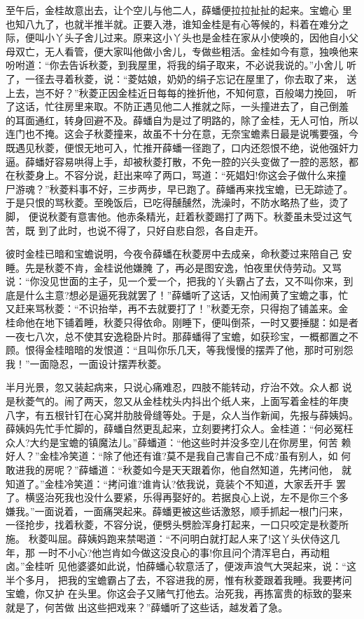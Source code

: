 至午后，金桂故意出去，让个空儿与他二人，薛蟠便拉拉扯扯的起来。宝蟾心
里也知八九了，也就半推半就。正要入港，谁知金桂是有心等候的，料着在难分之
际，便叫小丫头子舍儿过来。原来这小丫头也是金桂在家从小使唤的，因他自小父
母双亡，无人看管，便大家叫他做小舍儿，专做些粗活。金桂如今有意，独唤他来
吩咐道：“你去告诉秋菱，到我屋里，将我的绢子取来，不必说我说的。”小舍儿
听了，一径去寻着秋菱，说：“菱姑娘，奶奶的绢子忘记在屋里了，你去取了来，
送上去，岂不好？”秋菱正因金桂近日每每的挫折他，不知何意，百般竭力挽回，
听了这话，忙往房里来取。不防正遇见他二人推就之际，一头撞进去了，自己倒羞
的耳面通红，转身回避不及。薛蟠自为是过了明路的，除了金桂，无人可怕，所以
连门也不掩。这会子秋菱撞来，故虽不十分在意，无奈宝蟾素日最是说嘴要强，今
既遇见秋菱，便恨无地可入，忙推开薛蟠一径跑了，口内还怨恨不绝，说他强奸力
逼。薛蟠好容易哄得上手，却被秋菱打散，不免一腔的兴头变做了一腔的恶怒，都
在秋菱身上。不容分说，赶出来啐了两口，骂道：“死娼妇!你这会子做什么来撞
尸游魂？”秋菱料事不好，三步两步，早已跑了。薛蟠再来找宝蟾，已无踪迹了。
于是只恨的骂秋菱。至晚饭后，已吃得醺醺然，洗澡时，不防水略热了些，烫了脚，
便说秋菱有意害他。他赤条精光，赶着秋菱踢打了两下。秋菱虽未受过这气苦，既
到了此时，也说不得了，只好自悲自怨，各自走开。

彼时金桂已暗和宝蟾说明，今夜令薛蟠在秋菱房中去成亲，命秋菱过来陪自己
安睡。先是秋菱不肯，金桂说他嫌腌了，再必是图安逸，怕夜里伏侍劳动。又骂
说：“你没见世面的主子，见一个爱一个，把我的丫头霸占了去，又不叫你来，到
底是什么主意?想必是逼死我就罢了！”薛蟠听了这话，又怕闹黄了宝蟾之事，忙
又赶来骂秋菱：“不识抬举，再不去就要打了！”秋菱无奈，只得抱了铺盖来。金
桂命他在地下铺着睡，秋菱只得依命。刚睡下，便叫倒茶，一时又要捶腿：如是者
一夜七八次，总不使其安逸稳卧片时。那薛蟠得了宝蟾，如获珍宝，一概都置之不
顾。恨得金桂暗暗的发恨道：“且叫你乐几天，等我慢慢的摆弄了他，那时可别怨
我！”一面隐忍，一面设计摆弄秋菱。

半月光景，忽又装起病来，只说心痛难忍，四肢不能转动，疗治不效。众人都
说是秋菱气的。闹了两天，忽又从金桂枕头内抖出个纸人来，上面写着金桂的年庚
八字，有五根针钉在心窝并肋肢骨缝等处。于是，众人当作新闻，先报与薛姨妈。
薛姨妈先忙手忙脚的，薛蟠自然更乱起来，立刻要拷打众人。金桂道：“何必冤枉
众人?大约是宝蟾的镇魔法儿。”薛蟠道：“他这些时并没多空儿在你房里，何苦
赖好人？”金桂冷笑道：“除了他还有谁?莫不是我自己害自己不成?虽有别人，如
何敢进我的房呢？”薛蟠道：“秋菱如今是天天跟着你，他自然知道，先拷问他，
就知道了。”金桂冷笑道：“拷问谁?谁肯认?依我说，竟装个不知道，大家丢开手
罢了。横竖治死我也没什么要紧，乐得再娶好的。若据良心上说，左不是你三个多
嫌我。”一面说着，一面痛哭起来。薛蟠更被这些话激怒，顺手抓起一根门闩来，
一径抢步，找着秋菱，不容分说，便劈头劈脸浑身打起来，一口只咬定是秋菱所施。
秋菱叫屈。薛姨妈跑来禁喝道：“不问明白就打起人来了!这丫头伏侍这几年，那
一时不小心?他岂肯如今做这没良心的事!你且问个清浑皂白，再动粗卤。”金桂听
见他婆婆如此说，怕薛蟠心软意活了，便泼声浪气大哭起来，说：“这半个多月，
把我的宝蟾霸占了去，不容进我的房，惟有秋菱跟着我睡。我要拷问宝蟾，你又护
在头里。你这会子又赌气打他去。治死我，再拣富贵的标致的娶来就是了，何苦做
出这些把戏来？”薛蟠听了这些话，越发着了急。

